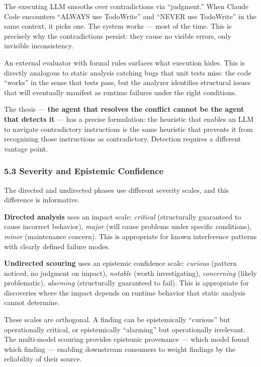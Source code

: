 \documentclass[
]{article}
\begin{document}
The executing LLM smooths over contradictions via ``judgment.'' When
Claude Code encounters ``ALWAYS use TodoWrite'' and ``NEVER use
TodoWrite'' in the same context, it picks one. The system works --- most
of the time. This is precisely why the contradictions persist: they
cause no visible errors, only invisible inconsistency.

An external evaluator with formal rules surfaces what execution hides.
This is directly analogous to static analysis catching bugs that unit
tests miss: the code ``works'' in the sense that tests pass, but the
analyzer identifies structural issues that will eventually manifest as
runtime failures under the right conditions.

The thesis --- \textbf{the agent that resolves the conflict cannot be
the agent that detects it} --- has a precise formulation: the heuristic
that enables an LLM to navigate contradictory instructions is the same
heuristic that prevents it from recognizing those instructions as
contradictory. Detection requires a different vantage point.

\hypertarget{severity-and-epistemic-confidence}{%
\subsubsection{5.3 Severity and Epistemic
Confidence}\label{severity-and-epistemic-confidence}}

The directed and undirected phases use different severity scales, and
this difference is informative.

\textbf{Directed analysis} uses an impact scale: \emph{critical}
(structurally guaranteed to cause incorrect behavior), \emph{major}
(will cause problems under specific conditions), \emph{minor}
(maintenance concern). This is appropriate for known interference
patterns with clearly defined failure modes.

\textbf{Undirected scouring} uses an epistemic confidence scale:
\emph{curious} (pattern noticed, no judgment on impact), \emph{notable}
(worth investigating), \emph{concerning} (likely problematic),
\emph{alarming} (structurally guaranteed to fail). This is appropriate
for discoveries where the impact depends on runtime behavior that static
analysis cannot determine.

These scales are orthogonal. A finding can be epistemically ``curious''
but operationally critical, or epistemically ``alarming'' but
operationally irrelevant. The multi-model scouring provides epistemic
provenance --- which model found which finding --- enabling downstream
consumers to weight findings by the reliability of their source.
\end{document}

